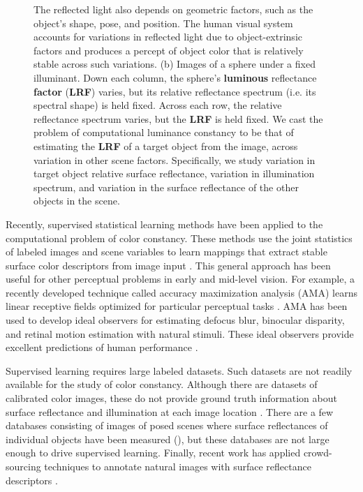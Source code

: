 \documentclass{jov}
\providecommand{\DIFaddtex}[1]{{\bf #1}} %
\providecommand{\DIFdeltex}[1]{} %
\providecommand{\DIFaddFL}[1]{\DIFadd{#1}} %
\providecommand{\DIFdelFL}[1]{\DIFdel{#1}} %
\providecommand{\DIFaddbeginFL}{} %
\providecommand{\DIFaddendFL}{} %
\providecommand{\DIFdelbeginFL}{} %
\providecommand{\DIFdelendFL}{} %
\providecommand{\DIFadd}[1]{\texorpdfstring{\DIFaddtex{#1}}{#1}} %
\providecommand{\DIFdel}[1]{\texorpdfstring{\DIFdeltex{#1}}{}} %
\newcommand{\DIFscaledelfig}{0.5}
\newlength{\DIFdelgraphicswidth} %
\newlength{\DIFdelgraphicsheight} %
\newcommand{\DIFaddincludegraphics}[2][]{{\color{blue}\fbox{\DIFOincludegraphics[#1]{#2}}}} %
\newcommand{\DIFdelincludegraphics}[2][]{%
\sbox{\DIFdelgraphicsbox}{\DIFOincludegraphics[#1]{#2}}%
\settoboxwidth{\DIFdelgraphicswidth}{\DIFdelgraphicsbox} %
\settoboxtotalheight{\DIFdelgraphicsheight}{\DIFdelgraphicsbox} %
\scalebox{\DIFscaledelfig}{%
\parbox[b]{\DIFdelgraphicswidth}{\usebox{\DIFdelgraphicsbox}\\[-\baselineskip] \rule{\DIFdelgraphicswidth}{0em}}\llap{\resizebox{\DIFdelgraphicswidth}{\DIFdelgraphicsheight}{%
\setlength{\unitlength}{\DIFdelgraphicswidth}%
\begin{picture}(1,1)%
\thicklines\linethickness{2pt} %
{\color[rgb]{1,0,0}\put(0,0){\framebox(1,1){}}}%
{\color[rgb]{1,0,0}\put(0,0){\line( 1,1){1}}}%
{\color[rgb]{1,0,0}\put(0,1){\line(1,-1){1}}}%
\end{picture}%
}\hspace*{3pt}}} %
} %
\DeclareRobustCommand{\DIFaddbeginFL}{\DIFOaddbeginFL \let\includegraphics\DIFaddincludegraphics} %
\DeclareRobustCommand{\DIFaddendFL}{\DIFOaddendFL \let\includegraphics\DIFOincludegraphics} %
\DeclareRobustCommand{\DIFdelbeginFL}{\DIFOdelbeginFL \let\includegraphics\DIFdelincludegraphics} %
\DeclareRobustCommand{\DIFdelendFL}{\DIFOaddendFL \let\includegraphics\DIFOincludegraphics} %
\begin{document}
\begin{figure}
{The reflected light also depends on geometric factors, such as the object's shape, pose, and position. 
The human visual system accounts for variations in reflected light due to object-extrinsic factors and produces a percept of object color that is relatively stable across such variations. 
(b) Images of a sphere under a fixed illuminant.  
Down each column, the sphere's \DIFdelbeginFL \DIFdelFL{light }\DIFdelendFL \DIFaddbeginFL \DIFaddFL{luminous }\DIFaddendFL reflectance \DIFdelbeginFL \DIFdelFL{value }\DIFdelendFL \DIFaddbeginFL \DIFaddFL{factor }\DIFaddendFL (\DIFdelbeginFL \DIFdelFL{LRV}\DIFdelendFL \DIFaddbeginFL \DIFaddFL{LRF}\DIFaddendFL ) varies, but its relative reflectance spectrum (i.e. its spectral shape) is held fixed.
Across each row, the relative reflectance spectrum varies, but the \DIFdelbeginFL \DIFdelFL{LRV }\DIFdelendFL \DIFaddbeginFL \DIFaddFL{LRF }\DIFaddendFL is held fixed.
We cast the problem of computational luminance constancy to be that of estimating the \DIFdelbeginFL \DIFdelFL{LRV }\DIFdelendFL \DIFaddbeginFL \DIFaddFL{LRF }\DIFaddendFL of a target object from the image, across variation in other scene factors. 
Specifically, we study variation in target object relative surface reflectance, variation in illumination spectrum, and variation in the surface reflectance of the other objects in the scene.}
 \end{figure}

Recently, supervised statistical learning methods have been applied to the computational problem of color constancy.
These methods use the joint statistics of labeled images and scene variables to learn mappings that extract stable surface color descriptors from image input \cite{barron2015convolutional}.
This general approach has been useful for other perceptual problems in early and mid-level vision.
For example, a recently developed technique called accuracy maximization analysis (AMA) learns linear receptive fields optimized for particular perceptual tasks \cite{geisler2009optimal,burge2017accuracy,jaini2017linking}. AMA has been used to develop ideal observers for estimating defocus blur, binocular disparity, and retinal motion estimation with natural stimuli. These ideal observers provide excellent predictions of human performance \cite{burge2011optimal, burge2012optimal, burge2014optimal, burge2015optimal}.

Supervised learning requires large labeled datasets. Such datasets are not readily available for the study of color constancy. Although there are datasets of calibrated color images, these do not provide ground truth information about surface reflectance and illumination at each image location \cite{ChakrabartiHyperspectral,NascimentoFoster2016,ParragaHyperspectralData,TkacikUpennHypersepctralData,skauli2013collection,olmos2004biologically}. There are a few databases consisting of images of posed scenes where surface reflectances of individual objects have been measured (), but these databases are not large enough to drive supervised learning. Finally, recent work has applied crowd-sourcing techniques to annotate natural images with surface reflectance descriptors \cite{bell2014intrinsic}.
\end{document}
